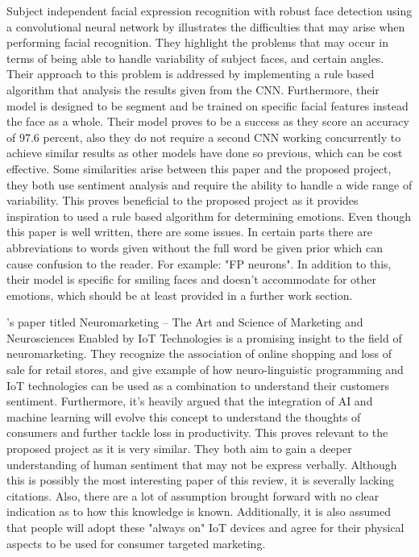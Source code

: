Subject independent facial expression recognition with robust face detection using a convolutional neural network by \citeauthor{MATSUGU} illustrates the difficulties that may arise when performing facial recognition. They highlight the problems that may occur in terms of being able to handle variability of subject faces, and certain angles. Their approach to this problem is addressed by implementing a rule based algorithm that analysis the results given from the CNN. Furthermore, their model is designed to be segment and be trained on specific facial features instead the face as a whole. Their model proves to be a success as they score an accuracy of 97.6 percent, also they do not require a second CNN working concurrently to achieve similar results as other models have done so previous, which can be cost effective. Some similarities arise between this paper and the proposed project, they both use sentiment analysis and require the ability to handle a wide range of variability. This proves beneficial to the proposed project as it provides inspiration to used a rule based algorithm for determining emotions. Even though this paper is well written, there are some issues. In certain parts there are abbreviations to words given without the full word be given prior which can cause confusion to the reader. For example: "FP neurons". In addition to this, their model is specific for smiling faces and doesn't accommodate for other emotions, which should be at least provided in a further work section. 

 \citeauthor{arthmann}'s paper titled Neuromarketing – The Art and Science of Marketing and Neurosciences Enabled by IoT Technologies is a promising insight to the field of neuromarketing. They recognize the association of online shopping and loss of sale for retail stores, and give example of how neuro-linguistic programming and IoT technologies can be used as a combination to understand their customers sentiment. Furthermore, it's heavily argued that the integration of AI and machine learning will evolve this concept to understand the thoughts of consumers and further tackle loss in productivity. This proves relevant to the proposed project as it is very similar. They both aim to gain a deeper understanding of human sentiment that may not be express verbally. Although this is possibly the most interesting paper of this review, it is severally lacking citations. Also, there are a lot of assumption brought forward with no clear indication as to how this knowledge is known. Additionally, it is also assumed that people will adopt these "always on" IoT devices and agree for their physical aspects to be used for consumer targeted marketing.
 
